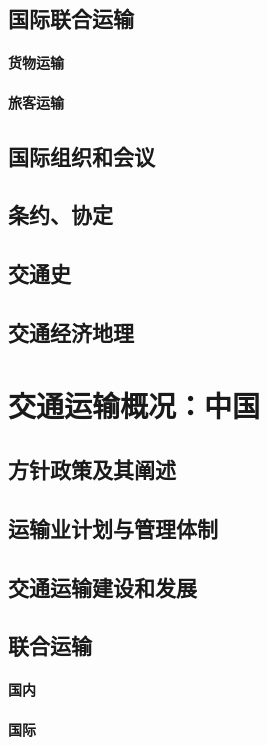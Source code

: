 \documentclass[UTF8]{../../RepresentationUniverse}
\begin{document}
\section{国际联合运输}
    \subsubsection{货物运输}
    \subsubsection{旅客运输}
\section{国际组织和会议}
\section{条约、协定}
\section{交通史}
\section{交通经济地理}

\chapter{交通运输概况：中国}
\section{方针政策及其阐述}
\section{运输业计划与管理体制}
\section{交通运输建设和发展}
\section{联合运输}
    \subsubsection{国内}
    \subsubsection{国际}
\end{document}
